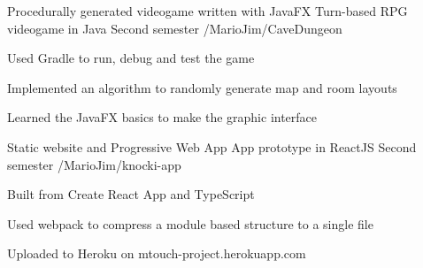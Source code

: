 

\begin{cventries}

\cventry
    {Procedurally generated videogame written with JavaFX} %
    {Turn-based RPG videogame in Java} %
    {Second semester} %
    {\faGithub/MarioJim/CaveDungeon}
    {
      \begin{cvitems} %
        \item {Used Gradle to run, debug and test the game}
        \item {Implemented an algorithm to randomly generate map and room layouts}
        \item {Learned the JavaFX basics to make the graphic interface}
      \end{cvitems}
    }
\cventry
    {Static website and Progressive Web App} %
    {App prototype in ReactJS} %
    {Second semester} %
    {\faGithub/MarioJim/knocki-app}
    {
      \begin{cvitems} %
        \item {Built from Create React App and TypeScript}
        \item {Used webpack to compress a module based structure to a single file}
        \item {Uploaded to Heroku on mtouch-project.herokuapp.com}
      \end{cvitems}
    }

\end{cventries}
